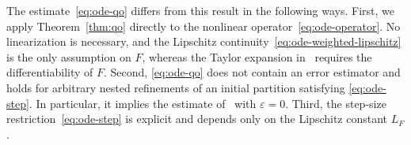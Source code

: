 \documentclass[10pt,reqno]{amsart}
\theoremstyle{definition}
\theoremstyle{remark}
\begin{document}
\noindent
The estimate~\eqref{eq:ode-qo} differs from this result in the following ways. First, we apply Theorem~\ref{thm:qo} directly to the nonlinear operator~\eqref{eq:ode-operator}. No linearization is necessary, and the Lipschitz continuity~\eqref{eq:ode-weighted-lipschitz} is the only assumption on $F$, whereas the Taylor expansion in~\cite{adaptive_ode} requires the differentiability of $F$. Second, \eqref{eq:ode-qo} does not contain an error estimator and holds for arbitrary nested refinements of an initial partition satisfying \eqref{eq:ode-step}. In particular, it implies the estimate of~\cite[Lemma~12]{adaptive_ode} with $\varepsilon=0$. Third, the step-size restriction~\eqref{eq:ode-step} is explicit and depends only on the Lipschitz constant $L_F$.
\printbibliography
\end{document}
